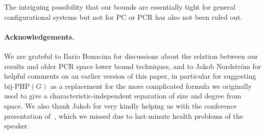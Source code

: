The intriguing possibility that our bounds are essentially tight for
general configurational systems but not for PC or PCR
has also not been ruled out.



\paragraph{Acknowledgements.} 
We are grateful to Ilario Bonacina for discussions about the relation between 
our results and older PCR space lower bound techniques, and to Jakob Nordstr\"{o}m for
helpful comments on an earlier version of this paper, in particular for suggesting
$\mathrm{bij}$-$\mathrm{PHP}(G)$ as a replacement for the more complicated formula 
we originally used to give a characteristic-independent
separation of size and degree from space.  We also thank Jakob for 
very kindly helping us
with the conference presentation of~\cite{conf-version},
which we missed due to last-minute health problems of the speaker.






